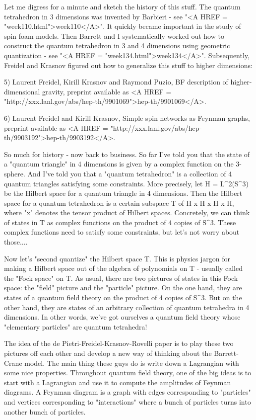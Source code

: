 Let me digress for a minute and sketch the history of this stuff.  The
quantum tetrahedron in 3 dimensions was invented by Barbieri - see
"<A HREF = "week110.html">week110</A>".  It quickly became
important in the study of spin foam models.  Then Barrett and I
systematically worked out how to construct the quantum tetrahedron in 3
and 4 dimensions using geometric quantization - see "<A HREF =
"week134.html">week134</A>".  Subsequently, Freidel and Krasnov
figured out how to generalize this stuff to higher dimensions:

5) Laurent Freidel, Kirill Krasnov and Raymond Puzio, BF description of
higher-dimensional gravity, preprint available as <A HREF = "http://xxx.lanl.gov/abs/hep-th/9901069">hep-th/9901069</A>.

6) Laurent Freidel and Kirill Krasnov, Simple spin networks as Feynman 
graphs, preprint available as <A HREF = "http://xxx.lanl.gov/abs/hep-th/9903192">hep-th/9903192</A>.

So much for history - now back to business.  So far I've told you that
the state of a "quantum triangle" in 4 dimensions is given by
a complex function on the 3-sphere.  And I've told you that a
"quantum tetrahedron" is a collection of 4 quantum triangles
satisfying some constraints.  More precisely, let 
H = L^{2}(S^{3})
be the
Hilbert space for a quantum triangle in 4 dimensions.  Then the Hilbert
space for a quantum tetrahedron is a certain subspace T of H x H x H x
H, where "x" denotes the tensor product of Hilbert spaces.
Concretely, we can think of states in T as complex functions on the
product of 4 copies of S^{3}.  These complex functions need to satisfy
some constraints, but let's not worry about those....

Now let's "second quantize" the Hilbert space T.  This is
physics jargon for making a Hilbert space out of the algebra of
polynomials on T - usually called the "Fock space" on T.  As
usual, there are two pictures of states in this Fock space: the
"field" picture and the "particle" picture.  On the
one hand, they are states of a quantum field theory on the product of 4
copies of S^{3}.  But on the other hand, they are states of an
arbitrary collection of quantum tetrahedra in 4 dimensions.  In other
words, we've got ourselves a quantum field theory whose "elementary
particles" are quantum tetrahedra!

The idea of the de Pietri-Freidel-Krasnov-Rovelli paper is to play these
two pictures off each other and develop a new way of thinking about the
Barrett-Crane model.  The main thing these guys do is write down a
Lagrangian with some nice properties.  Throughout quantum field theory,
one of the big ideas is to start with a Lagrangian and use it to compute
the amplitudes of Feynman diagrams.  A Feynman diagram is a graph with
edges corresponding to "particles" and vertices corresponding to
"interactions" where a bunch of particles turns into another bunch of
particles.  

